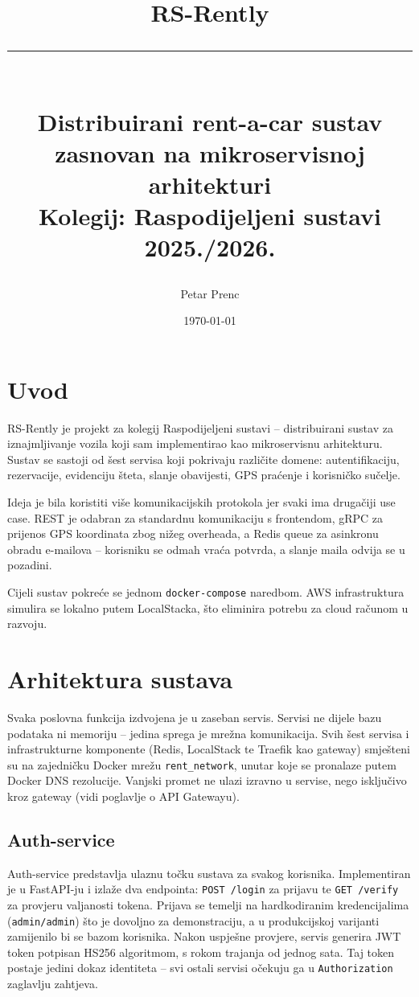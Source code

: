 \documentclass[12pt,a4paper]{article}
\title{
  \vspace{2cm}
  {\Huge\textbf{\color{accent}RS-Rently}}\\[0.6cm]
  {\color{accent}\rule{0.5\textwidth}{1.2pt}}\\[0.6cm]
  {\Large Distribuirani rent-a-car sustav}\\[0.3cm]
  {\large zasnovan na mikroservisnoj arhitekturi}\\[2.5cm]
  {\normalsize Kolegij: Raspodijeljeni sustavi 2025./2026.}
}
\author{Petar Prenc}
\date{\today}
\begin{document}
\maketitle
\thispagestyle{empty}
\newpage

\tableofcontents
\newpage

\section{Uvod}

RS-Rently je projekt za kolegij Raspodijeljeni sustavi -- distribuirani sustav za iznajmljivanje vozila koji sam implementirao kao mikroservisnu arhitekturu. Sustav se sastoji od šest servisa koji pokrivaju različite domene: autentifikaciju, rezervacije, evidenciju šteta, slanje obavijesti, GPS praćenje i korisničko sučelje.

Ideja je bila koristiti više komunikacijskih protokola jer svaki ima drugačiji use case. REST je odabran za standardnu komunikaciju s frontendom, gRPC za prijenos GPS koordinata zbog nižeg overheada, a Redis queue za asinkronu obradu e-mailova -- korisniku se odmah vraća potvrda, a slanje maila odvija se u pozadini.

Cijeli sustav pokreće se jednom \texttt{docker-compose} naredbom. AWS infrastruktura simulira se lokalno putem LocalStacka, što eliminira potrebu za cloud računom u razvoju.

\section{Arhitektura sustava}

Svaka poslovna funkcija izdvojena je u zaseban servis. Servisi ne dijele bazu podataka ni memoriju -- jedina sprega je mrežna komunikacija. Svih šest servisa i infrastrukturne komponente (Redis, LocalStack te Traefik kao gateway) smješteni su na zajedničku Docker mrežu \texttt{rent\_network}, unutar koje se pronalaze putem Docker DNS rezolucije. Vanjski promet ne ulazi izravno u servise, nego isključivo kroz gateway (vidi poglavlje o API Gatewayu).

\subsection{Auth-service}

Auth-service predstavlja ulaznu točku sustava za svakog korisnika. Implementiran je u FastAPI-ju i izlaže dva endpointa: \texttt{POST /login} za prijavu te \texttt{GET /verify} za provjeru valjanosti tokena. Prijava se temelji na hardkodiranim kredencijalima (\texttt{admin/admin}) što je dovoljno za demonstraciju, a u produkcijskoj varijanti zamijenilo bi se bazom korisnika. Nakon uspješne provjere, servis generira JWT token potpisan HS256 algoritmom, s rokom trajanja od jednog sata. Taj token postaje jedini dokaz identiteta -- svi ostali servisi očekuju ga u \texttt{Authorization} zaglavlju zahtjeva.
\end{document}
